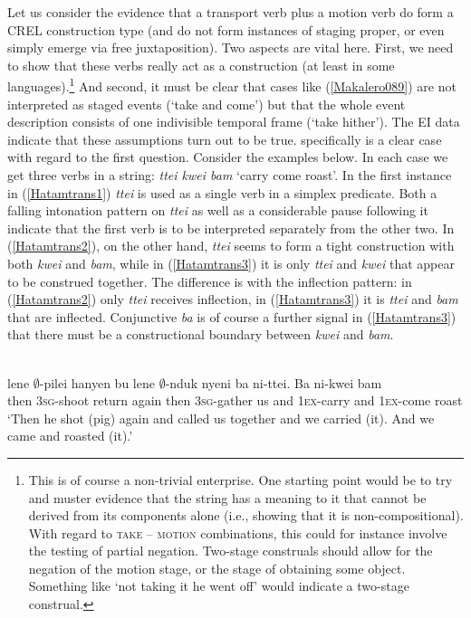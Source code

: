 \largerpage[-1]
Let us consider the evidence that a transport verb plus a motion verb do form a CREL construction type (and do not form instances of staging proper, or even simply emerge via free juxtaposition). Two aspects are vital here. First, we need to show that these verbs really act as a construction (at least in some languages).\footnote{This is of course a non-trivial enterprise. One starting point would be to try and muster evidence that the string has a meaning to it that cannot be derived from its components alone (i.e., showing that it is non-compositional). With regard to \textsc{take} -- \textsc{motion} combinations, this could for instance involve the testing of partial negation. Two-stage construals should allow for the negation of the motion stage, or the stage of obtaining some object. Something like `not taking it he went off' would indicate a two-stage construal.} And second, it must be clear that cases like (\ref{Makalero089}) are not interpreted as staged events (`take and come') but that the whole event description consists of one indivisible temporal frame (`take hither'). The EI data indicate that these assumptions turn out to be true.  specifically is a clear case with regard to the first question. Consider the examples below. In each case we get three verbs in a string: \textit{ttei kwei bam} `carry come roast'. In the first instance in (\ref{Hatamtrans1}) \textit{ttei} is used as a single verb in a simplex predicate. Both a falling intonation pattern on \textit{ttei} as well as a considerable pause following it indicate that the first verb is to be interpreted separately from the other two. In (\ref{Hatamtrans2}), on the other hand, \textit{ttei} seems to form a tight construction with both \textit{kwei} and \textit{bam}, while in (\ref{Hatamtrans3}) it is only \textit{ttei} and \textit{kwei} that appear to be construed together. The difference is with the inflection pattern: in (\ref{Hatamtrans2}) only \textit{ttei} receives inflection, in (\ref{Hatamtrans3}) it is \textit{ttei} and \textit{bam} that are inflected. Conjunctive \textit{ba} is of course a further signal in (\ref{Hatamtrans3}) that there must be a constructional boundary between \textit{kwei} and \textit{bam}.

\a \label{Hatamtrans1}
\\
\gll lene $\emptyset$-pilei hanyen bu lene $\emptyset$-nduk nyeni ba ni-ttei. Ba ni-kwei bam \\
then \textsc{3}\textsc{sg}-shoot return again then \textsc{3}\textsc{sg}-gather us and \textsc{1}\textsc{ex}-carry and \textsc{1}\textsc{ex}-come roast \\
\glft `Then he shot (pig) again and called us together and we carried (it). And we came and roasted (it).' \\
\z

